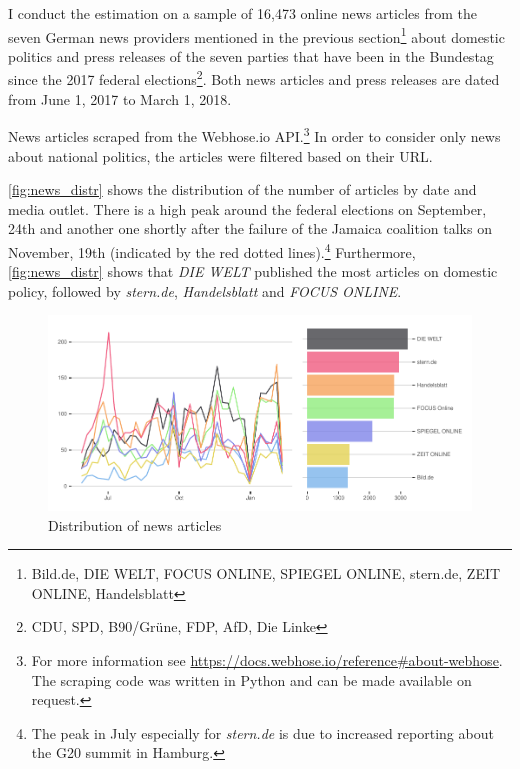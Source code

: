 \documentclass[
]{article}
\begin{document}
I conduct the estimation on a sample of 16,473 online news articles from
the seven German news providers mentioned in the previous
section\footnote{Bild.de, DIE WELT, FOCUS ONLINE, SPIEGEL ONLINE,
  stern.de, ZEIT ONLINE, Handelsblatt} about domestic politics and press
releases of the seven parties that have been in the Bundestag since the
2017 federal elections\footnote{CDU, SPD, B90/Grüne, FDP, AfD, Die Linke}.
Both news articles and press releases are dated from June 1, 2017 to
March 1, 2018.

News articles scraped from the Webhose.io API.\footnote{For more
  information see
  \url{https://docs.webhose.io/reference\#about-webhose}. The scraping
  code was written in Python and can be made available on request.} In
order to consider only news about national politics, the articles were
filtered based on their URL.

\autoref{fig:news_distr} shows the distribution of the number of
articles by date and media outlet. There is a high peak around the
federal elections on September, 24th and another one shortly after the
failure of the Jamaica coalition talks on November, 19th (indicated by
the red dotted lines).\footnote{The peak in July especially for
  \emph{stern.de} is due to increased reporting about the G20 summit in
  Hamburg.} Furthermore, \autoref{fig:news_distr} shows that \emph{DIE
WELT} published the most articles on domestic policy, followed by
\emph{stern.de}, \emph{Handelsblatt} and \emph{FOCUS ONLINE}.

\begin{figure}

{\centering \includegraphics[width=1\linewidth]{main_text_files/figure-latex/news articles-1} 

}

\caption{Distribution of news articles \label{fig:news_distr}}\label{fig:news articles}
\end{figure}
\end{document}
